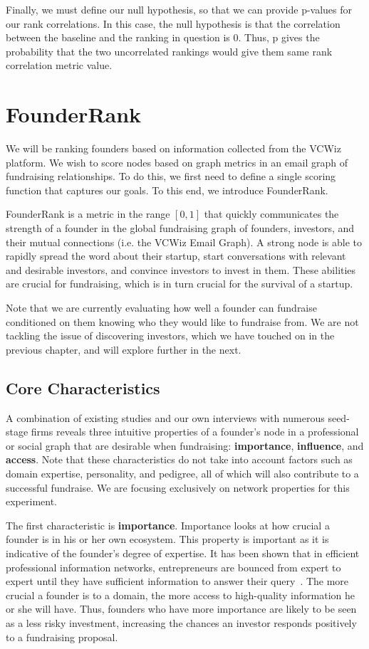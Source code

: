 Finally, we must define our null hypothesis, so that we can provide p-values for our rank correlations. In this case, the null hypothesis is that the correlation between the baseline and the ranking in question is 0. Thus, p gives the probability that the two uncorrelated rankings would give them same rank correlation metric value.

\section{FounderRank}

We will be ranking founders based on information collected from the VCWiz platform. We wish to score nodes based on graph metrics in an email graph of fundraising relationships. To do this, we first need to define a single scoring function that captures our goals. To this end, we introduce FounderRank.

FounderRank is a metric in the range $[0, 1]$ that quickly communicates the strength of a founder in the global fundraising graph of founders, investors, and their mutual connections (i.e. the VCWiz Email Graph). A strong node is able to rapidly spread the word about their startup, start conversations with relevant and desirable investors, and convince investors to invest in them. These abilities are crucial for fundraising, which is in turn crucial for the survival of a startup.

Note that we are currently evaluating how well a founder can fundraise conditioned on them knowing who they would like to fundraise from. We are not tackling the issue of discovering investors, which we have touched on in the previous chapter, and will explore further in the next.

\subsection{Core Characteristics}

A combination of existing studies and our own interviews with numerous seed-stage firms reveals three intuitive properties of a founder's node in a professional or social graph that are desirable when fundraising: \textbf{importance}, \textbf{influence}, and \textbf{access}. Note that these characteristics do not take into account factors such as domain expertise, personality, and pedigree, all of which will also contribute to a successful fundraise. We are focusing exclusively on network properties for this experiment.

The first characteristic is \textbf{importance}. Importance looks at how crucial a founder is in his or her own ecosystem. This property is important as it is indicative of the founder's degree of expertise. It has been shown that in efficient professional information networks, entrepreneurs are bounced from expert to expert until they have sufficient information to answer their query~\cite{BIRLEY1985107}. The more crucial a founder is to a domain, the more access to high-quality information he or she will have. Thus, founders who have more importance are likely to be seen as a less risky investment, increasing the chances an investor responds positively to a fundraising proposal.


